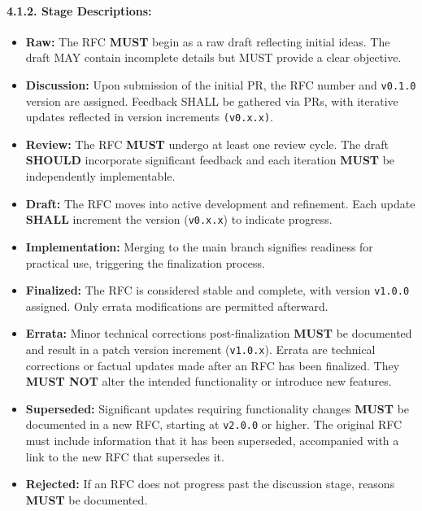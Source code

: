 \paragraph{\texorpdfstring{4.1.2. \textbf{Stage
Descriptions:}}{4.1.2. Stage Descriptions:}}\label{stage-descriptions}

\begin{itemize}
\tightlist
\item
  \textbf{Raw:} The RFC \textbf{MUST} begin as a raw draft reflecting
  initial ideas. The draft MAY contain incomplete details but MUST
  provide a clear objective.
\item
  \textbf{Discussion:} Upon submission of the initial PR, the RFC number
  and \texttt{v0.1.0} version are assigned. Feedback SHALL be gathered
  via PRs, with iterative updates reflected in version increments
  \texttt{(v0.x.x)}.
\item
  \textbf{Review:} The RFC \textbf{MUST} undergo at least one review
  cycle. The draft \textbf{SHOULD} incorporate significant feedback and
  each iteration \textbf{MUST} be independently implementable.
\item
  \textbf{Draft:} The RFC moves into active development and refinement.
  Each update \textbf{SHALL} increment the version (\texttt{v0.x.x}) to
  indicate progress.
\item
  \textbf{Implementation:} Merging to the main branch signifies
  readiness for practical use, triggering the finalization process.
\item
  \textbf{Finalized:} The RFC is considered stable and complete, with
  version \texttt{v1.0.0} assigned. Only errata modifications are
  permitted afterward.
\item
  \textbf{Errata:} Minor technical corrections post-finalization
  \textbf{MUST} be documented and result in a patch version increment
  (\texttt{v1.0.x}). Errata are technical corrections or factual updates
  made after an RFC has been finalized. They \textbf{MUST NOT} alter the
  intended functionality or introduce new features.
\item
  \textbf{Superseded:} Significant updates requiring functionality
  changes \textbf{MUST} be documented in a new RFC, starting at
  \texttt{v2.0.0} or higher. The original RFC must include information
  that it has been superseded, accompanied with a link to the new RFC
  that supersedes it.
\item
  \textbf{Rejected:} If an RFC does not progress past the discussion
  stage, reasons \textbf{MUST} be documented.
\end{itemize}

